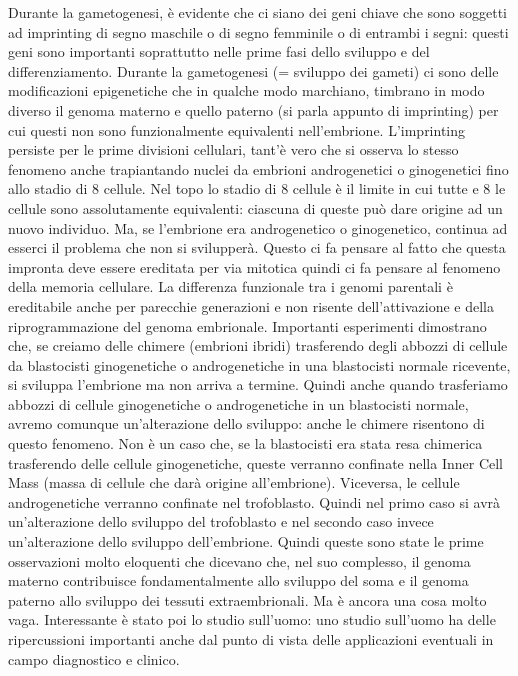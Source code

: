 \documentclass[11pt]{book}
\begin{document}
Durante la gametogenesi, è evidente che ci siano dei geni chiave che sono soggetti ad imprinting di segno maschile o di segno femminile o di entrambi i segni: questi geni sono importanti soprattutto nelle prime fasi dello sviluppo e del differenziamento.
Durante la gametogenesi (= sviluppo dei gameti) ci sono delle modificazioni epigenetiche che in qualche modo marchiano, timbrano in modo diverso il genoma materno e quello paterno (si parla appunto di imprinting) per cui questi non  sono funzionalmente equivalenti nell’embrione.
L’imprinting persiste per le prime divisioni cellulari, tant’è vero che si osserva lo stesso fenomeno anche trapiantando nuclei da embrioni androgenetici o ginogenetici fino allo stadio di 8 cellule. Nel topo lo stadio di 8 cellule è il limite in cui tutte e 8 le cellule sono assolutamente equivalenti: ciascuna di queste può dare origine ad un nuovo individuo. Ma, se l’embrione era androgenetico o ginogenetico, continua ad esserci il problema che non si svilupperà. 
Questo ci fa pensare al fatto che questa impronta deve essere ereditata per via mitotica quindi ci fa pensare al fenomeno della memoria cellulare. La differenza funzionale tra i genomi parentali è ereditabile anche per parecchie generazioni e non risente dell’attivazione e della riprogrammazione del genoma embrionale.
Importanti esperimenti dimostrano che, se creiamo delle chimere (embrioni ibridi) trasferendo degli abbozzi di cellule da blastocisti ginogenetiche o androgenetiche in una blastocisti normale ricevente, si sviluppa l’embrione ma non arriva a termine. Quindi anche quando trasferiamo abbozzi di cellule ginogenetiche o androgenetiche in un blastocisti normale, avremo comunque un’alterazione dello sviluppo: anche le chimere risentono di questo fenomeno.
Non è un caso che, se la blastocisti era stata resa chimerica trasferendo delle cellule ginogenetiche, queste verranno confinate nella Inner Cell Mass (massa di cellule che darà origine all’embrione). Viceversa, le cellule androgenetiche verranno confinate nel trofoblasto. Quindi nel primo caso si avrà un’alterazione dello sviluppo del trofoblasto e nel secondo caso invece un’alterazione dello sviluppo dell’embrione.
Quindi queste sono state le prime osservazioni molto eloquenti che dicevano che, nel suo complesso, il genoma materno contribuisce fondamentalmente allo sviluppo del soma e il genoma paterno allo sviluppo dei tessuti extraembrionali. Ma è ancora una cosa molto vaga.
Interessante è stato poi lo studio sull’uomo: uno studio sull’uomo ha delle ripercussioni importanti anche dal punto di vista delle applicazioni eventuali in campo diagnostico e clinico. 
\end{document}
